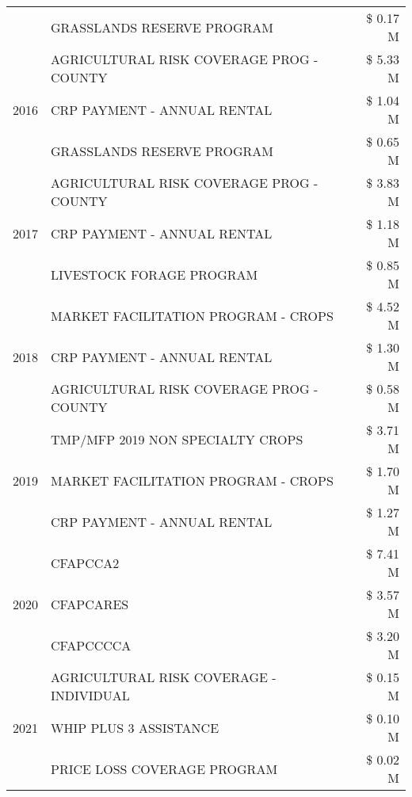 \begin{tabular}{llr}
 & GRASSLANDS RESERVE PROGRAM & \$ 0.17 M \\
\cline{1-3}
\multirow[t]{3}{*}{2016} & AGRICULTURAL RISK COVERAGE PROG - COUNTY & \$ 5.33 M \\
 & CRP PAYMENT - ANNUAL RENTAL & \$ 1.04 M \\
 & GRASSLANDS RESERVE PROGRAM & \$ 0.65 M \\
\cline{1-3}
\multirow[t]{3}{*}{2017} & AGRICULTURAL RISK COVERAGE PROG - COUNTY & \$ 3.83 M \\
 & CRP PAYMENT - ANNUAL RENTAL & \$ 1.18 M \\
 & LIVESTOCK FORAGE PROGRAM & \$ 0.85 M \\
\cline{1-3}
\multirow[t]{3}{*}{2018} & MARKET FACILITATION PROGRAM - CROPS & \$ 4.52 M \\
 & CRP PAYMENT - ANNUAL RENTAL & \$ 1.30 M \\
 & AGRICULTURAL RISK COVERAGE PROG - COUNTY & \$ 0.58 M \\
\cline{1-3}
\multirow[t]{3}{*}{2019} & TMP/MFP 2019 NON SPECIALTY CROPS & \$ 3.71 M \\
 & MARKET FACILITATION PROGRAM - CROPS & \$ 1.70 M \\
 & CRP PAYMENT - ANNUAL RENTAL & \$ 1.27 M \\
\cline{1-3}
\multirow[t]{3}{*}{2020} & CFAPCCA2 & \$ 7.41 M \\
 & CFAPCARES & \$ 3.57 M \\
 & CFAPCCCCA & \$ 3.20 M \\
\cline{1-3}
\multirow[t]{3}{*}{2021} & AGRICULTURAL RISK COVERAGE - INDIVIDUAL & \$ 0.15 M \\
 & WHIP PLUS 3 ASSISTANCE & \$ 0.10 M \\
 & PRICE LOSS COVERAGE PROGRAM & \$ 0.02 M \\
\cline{1-3}
\bottomrule
\end{tabular}
